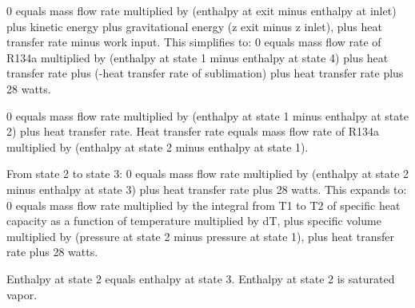 0 equals mass flow rate multiplied by (enthalpy at exit minus enthalpy at inlet) plus kinetic energy plus gravitational energy (z exit minus z inlet), plus heat transfer rate minus work input.  
This simplifies to:  
0 equals mass flow rate of R134a multiplied by (enthalpy at state 1 minus enthalpy at state 4) plus heat transfer rate plus (-heat transfer rate of sublimation) plus heat transfer rate plus 28 watts.  

0 equals mass flow rate multiplied by (enthalpy at state 1 minus enthalpy at state 2) plus heat transfer rate.  
Heat transfer rate equals mass flow rate of R134a multiplied by (enthalpy at state 2 minus enthalpy at state 1).  

From state 2 to state 3:  
0 equals mass flow rate multiplied by (enthalpy at state 2 minus enthalpy at state 3) plus heat transfer rate plus 28 watts.  
This expands to:  
0 equals mass flow rate multiplied by the integral from T1 to T2 of specific heat capacity as a function of temperature multiplied by dT, plus specific volume multiplied by (pressure at state 2 minus pressure at state 1), plus heat transfer rate plus 28 watts.  

Enthalpy at state 2 equals enthalpy at state 3.  
Enthalpy at state 2 is saturated vapor.